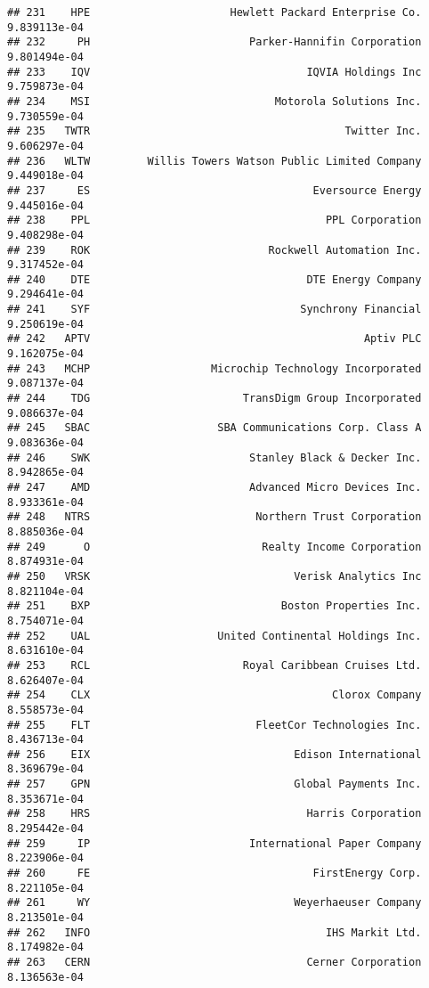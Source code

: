 \documentclass[
]{article}
\begin{document}
\begin{verbatim}
## 231    HPE                      Hewlett Packard Enterprise Co. 9.839113e-04
## 232     PH                         Parker-Hannifin Corporation 9.801494e-04
## 233    IQV                                  IQVIA Holdings Inc 9.759873e-04
## 234    MSI                             Motorola Solutions Inc. 9.730559e-04
## 235   TWTR                                        Twitter Inc. 9.606297e-04
## 236   WLTW         Willis Towers Watson Public Limited Company 9.449018e-04
## 237     ES                                   Eversource Energy 9.445016e-04
## 238    PPL                                     PPL Corporation 9.408298e-04
## 239    ROK                            Rockwell Automation Inc. 9.317452e-04
## 240    DTE                                  DTE Energy Company 9.294641e-04
## 241    SYF                                 Synchrony Financial 9.250619e-04
## 242   APTV                                           Aptiv PLC 9.162075e-04
## 243   MCHP                   Microchip Technology Incorporated 9.087137e-04
## 244    TDG                        TransDigm Group Incorporated 9.086637e-04
## 245   SBAC                    SBA Communications Corp. Class A 9.083636e-04
## 246    SWK                         Stanley Black & Decker Inc. 8.942865e-04
## 247    AMD                         Advanced Micro Devices Inc. 8.933361e-04
## 248   NTRS                          Northern Trust Corporation 8.885036e-04
## 249      O                           Realty Income Corporation 8.874931e-04
## 250   VRSK                                Verisk Analytics Inc 8.821104e-04
## 251    BXP                              Boston Properties Inc. 8.754071e-04
## 252    UAL                    United Continental Holdings Inc. 8.631610e-04
## 253    RCL                        Royal Caribbean Cruises Ltd. 8.626407e-04
## 254    CLX                                      Clorox Company 8.558573e-04
## 255    FLT                          FleetCor Technologies Inc. 8.436713e-04
## 256    EIX                                Edison International 8.369679e-04
## 257    GPN                                Global Payments Inc. 8.353671e-04
## 258    HRS                                  Harris Corporation 8.295442e-04
## 259     IP                         International Paper Company 8.223906e-04
## 260     FE                                   FirstEnergy Corp. 8.221105e-04
## 261     WY                                Weyerhaeuser Company 8.213501e-04
## 262   INFO                                     IHS Markit Ltd. 8.174982e-04
## 263   CERN                                  Cerner Corporation 8.136563e-04

\end{verbatim}
\end{document}
